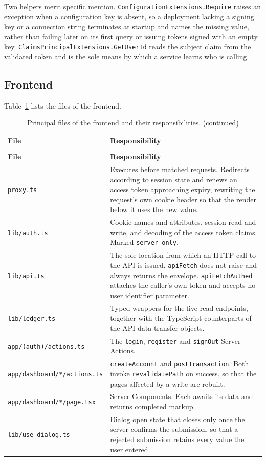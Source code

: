 \documentclass[11pt,a4paper]{article}
\newcommand{\code}[1]{\texttt{\fontsize{8.6}{10}\selectfont #1}}
\begin{document}
Two helpers merit specific mention. \code{ConfigurationExtensions.Require}
raises an exception when a configuration key is absent, so a deployment lacking a
signing key or a connection string terminates at startup and names the missing
value, rather than failing later on its first query or issuing tokens signed with
an empty key. \code{ClaimsPrincipalExtensions.GetUserId} reads the subject claim
from the validated token and is the sole means by which a service learns who is
calling.

\subsection{Frontend}

Table~\ref{tab:frontend} lists the files of the frontend.

{\setlength{\LTpre}{8pt}\setlength{\LTpost}{8pt}
\begin{longtable}{@{}p{5.0cm}p{10.0cm}@{}}
\caption{Principal files of the frontend and their responsibilities.}
\label{tab:frontend}\\
\toprule
\textbf{\sffamily\small File} & \textbf{\sffamily\small Responsibility}\\
\midrule
\endfirsthead
\caption[]{Principal files of the frontend and their responsibilities. (continued)}\\
\toprule
\textbf{\sffamily\small File} & \textbf{\sffamily\small Responsibility}\\
\midrule
\endhead
\bottomrule
\endlastfoot
\code{proxy.ts} &
  Executes before matched requests. Redirects according to session state and
  renews an access token approaching expiry, rewriting the request's own cookie
  header so that the render below it uses the new value.\\
\code{lib/auth.ts} &
  Cookie names and attributes, session read and write, and decoding of the
  access token claims. Marked \code{server-only}.\\
\code{lib/api.ts} &
  The sole location from which an HTTP call to the API is issued.
  \code{apiFetch} does not raise and always returns the envelope.
  \code{apiFetchAuthed} attaches the caller's own token and accepts no user
  identifier parameter.\\
\code{lib/ledger.ts} &
  Typed wrappers for the five read endpoints, together with the TypeScript
  counterparts of the API data transfer objects.\\
\code{app/(auth)/actions.ts} &
  The \code{login}, \code{register} and \code{signOut} Server Actions.\\
\code{app/dashboard/*/actions.ts} &
  \code{createAccount} and \code{postTransaction}. Both invoke
  \code{revalidatePath} on success, so that the pages affected by a write are
  rebuilt.\\
\code{app/dashboard/*/page.tsx} &
  Server Components. Each awaits its data and returns completed markup.\\
\code{lib/use-dialog.ts} &
  Dialog open state that closes only once the server confirms the submission,
  so that a rejected submission retains every value the user entered.\\
\end{longtable}}
\end{document}
